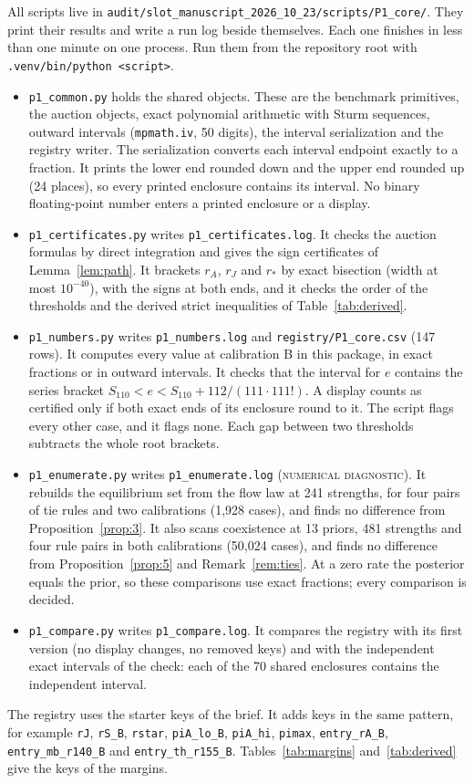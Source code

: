 \documentclass[11pt]{article}
\theoremstyle{definition}
\newcommand{\lab}[1]{\textsc{#1}}
\begin{document}
All scripts live in \texttt{audit/slot\_manuscript\_2026\_10\_23/scripts/P1\_core/}. They print their results and
write a run log beside themselves. Each one finishes in less than one minute on one process. Run them from the
repository root with \texttt{.venv/bin/python <script>}.
\begin{itemize}
\item \texttt{p1\_common.py} holds the shared objects. These are the benchmark primitives, the auction objects,
  exact polynomial arithmetic with Sturm sequences, outward intervals (\texttt{mpmath.iv}, 50 digits), the
  interval serialization and the registry writer. The serialization converts each interval endpoint exactly to a
  fraction. It prints the lower end rounded down and the upper end rounded up (24 places), so every printed
  enclosure contains its interval. No binary floating-point number enters a printed enclosure or a display.
\item \texttt{p1\_certificates.py} writes \texttt{p1\_certificates.log}. It checks the auction formulas by direct
  integration and gives the sign certificates of Lemma~\ref{lem:path}. It brackets $r_A$, $r_J$ and $r_*$ by
  exact bisection (width at most $10^{-40}$), with the signs at both ends, and it checks the order of the
  thresholds and the derived strict inequalities of Table~\ref{tab:derived}.
\item \texttt{p1\_numbers.py} writes \texttt{p1\_numbers.log} and \texttt{registry/P1\_core.csv} (147 rows). It
  computes every value at calibration B in this package, in exact fractions or in outward intervals. It checks
  that the interval for $e$ contains the series bracket $S_{110}<e<S_{110}+112/(111\cdot111!)$. A display counts as
  certified only if both exact ends of its enclosure round to it. The script flags every other case, and it flags
  none. Each gap between two thresholds subtracts the whole root brackets.
\item \texttt{p1\_enumerate.py} writes \texttt{p1\_enumerate.log} (\lab{numerical diagnostic}). It rebuilds the
  equilibrium set from the flow law at 241 strengths, for four pairs of tie rules and two calibrations (1,928
  cases), and finds no difference from Proposition~\ref{prop:3}. It also scans coexistence at 13 priors, 481
  strengths and four rule pairs in both calibrations (50,024 cases), and finds no difference from
  Proposition~\ref{prop:5} and Remark~\ref{rem:ties}. At a zero rate the posterior equals the prior, so these
  comparisons use exact fractions; every comparison is decided.
\item \texttt{p1\_compare.py} writes \texttt{p1\_compare.log}. It compares the registry with its first version
  (no display changes, no removed keys) and with the independent exact intervals of the check: each of the 70
  shared enclosures contains the independent interval.
\end{itemize}
The registry uses the starter keys of the brief. It adds keys in the same pattern, for example \texttt{rJ},
\texttt{rS\_B}, \texttt{rstar}, \texttt{piA\_lo\_B}, \texttt{piA\_hi}, \texttt{pimax}, \texttt{entry\_rA\_B},
\texttt{entry\_mb\_r140\_B} and \texttt{entry\_th\_r155\_B}. Tables~\ref{tab:margins} and~\ref{tab:derived} give the
keys of the margins.
\end{document}
